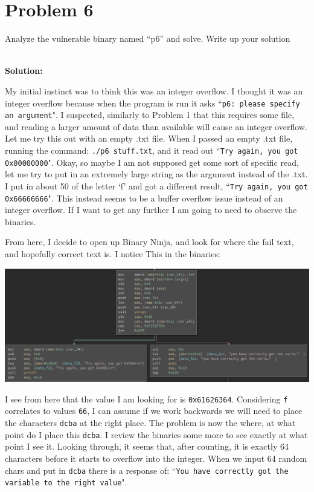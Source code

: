 \documentclass[12pt]{article}
\newcommand\tab[1][0.5cm]{\hspace*{#1}}
\begin{document}
\section{Problem 6}
\tab Analyze the vulnerable binary named “p6” and solve. Write up your solution

\textbf{\\Solution:\\}

\tab My initial instinct was to think this was an integer overflow. I thought it was an integer overflow
because when the program is run it asks ``\texttt{p6: please specify an argument}". I suspected, similarly to 
Problem 1 that this requires some file, and reading a larger amount of data than available will cause an integer
overflow. Let me try this out with an empty .txt file. When I passed an empty .txt file, running the command:
\texttt{./p6 stuff.txt}, and it read out ``\texttt{Try again, you got 0x00000000}". Okay, so maybe I am not supposed
get some sort of specific read, let me try to put in an extremely large string as the argument instead of the .txt. 
I put in about 50 of the letter `f' and got a different result, ``\texttt{Try again, you got 0x66666666}". This instead
seems to be a buffer overflow issue instead of an integer overflow. If I want to get any further I am going to need to 
observe the binaries. 

From here, I decide to open up Binary Ninja, and look for where the fail text, and hopefully correct text is. I notice
This in the binaries:

\begin{center}
	\includegraphics[scale=.45]{photos/p6pic1.png}
\end{center}

I see from here that the value I am looking for is \texttt{0x61626364}. Considering \texttt{f} correlates to values 
\texttt{66}, I can assume if we work backwards we will need to place the characters \texttt{dcba} at the right place. 
The problem is now the where, at what point do I place this \texttt{dcba}. I review the binaries some more to see exactly
at what point I see it. Looking through, it seems that, after counting, it is exactly 64 characters before it starts to
overflow into the integer. When we input 64 random chars and put in \texttt{dcba} there is a response of:
``\texttt{You have correctly got the variable to the right value}". 
\end{document}
